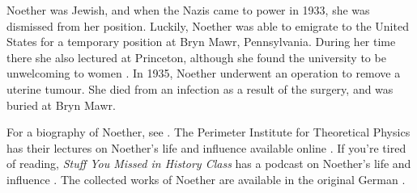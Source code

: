 \documentclass[../../../include/open-logic-section]{subfiles}
\begin{document}
Noether was Jewish, and when the Nazis came to power in 1933, she was
dismissed from her position. Luckily, Noether was able to emigrate to
the United States for a temporary position at Bryn Mawr,
Pennsylvania. During her time there she also lectured at Princeton,
although she found the university to be unwelcoming to women
\citep[81]{Dick1981}. In 1935, Noether underwent an operation to
remove a uterine tumour. She died from an infection as a result of the
surgery, and was buried at Bryn Mawr.

\begin{reading} 
For a biography of Noether, see \citet{Dick1981}.  The Perimeter
Institute for Theoretical Physics has their lectures on Noether's life
and influence available online \citep{Perimeter2015}.  If you're tired
of reading, \emph{Stuff You Missed in History Class} has a podcast on
Noether's life and influence \citep{Frey2015}.  The collected works of
Noether are available in the original German \citep{Noether1983}.
\end{reading}
\end{document}
